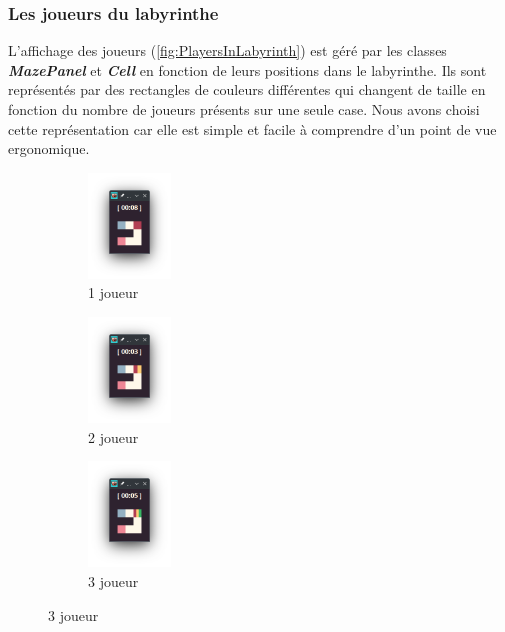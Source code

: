 \FloatBarrier

\subsubsection*{Les joueurs du labyrinthe}

L'affichage des joueurs (\ref{fig:PlayersInLabyrinth}) est géré par les classes \textbf{\textit{MazePanel}} et \textbf{\textit{Cell}} en fonction de leurs positions dans le labyrinthe. Ils sont représentés par des rectangles de couleurs différentes qui changent de taille en fonction du nombre de joueurs présents sur une seule case. Nous avons choisi cette représentation car elle est simple et facile à comprendre d'un point de vue ergonomique.

\begin{figure}[!htb]
    \centering
    \begin{subfigure}{2.2cm}
        \includegraphics[width=2.2cm]{ressources/Implementation/Labyrinthe/Vue/Players/1Player.png}%
        \caption{1 joueur}
        \label{fig:1Player}
    \end{subfigure}
    \qquad
    \begin{subfigure}{2.2cm}
        \includegraphics[width=2.2cm]{ressources/Implementation/Labyrinthe/Vue/Players/2Players.png}%
        \caption{2 joueur}
        \label{fig:2Players}
    \end{subfigure}
    \qquad
    \begin{subfigure}{2.2cm}
        \includegraphics[width=2.2cm]{ressources/Implementation/Labyrinthe/Vue/Players/3Players.png}%
        \caption{3 joueur}

\end{subfigure}
\end{figure}
